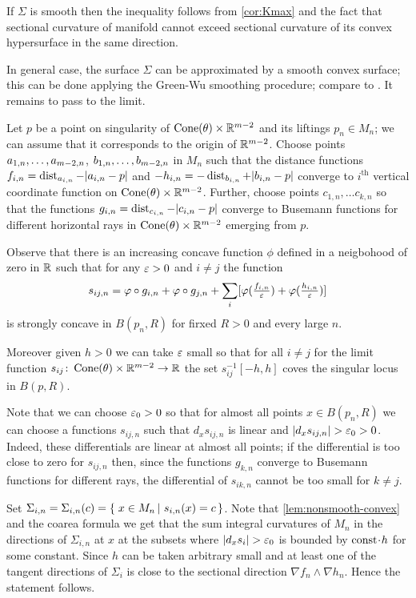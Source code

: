  If $\Sigma$ is smooth then the inequality follows from \ref{cor:Kmax} and the fact that sectional curvature of manifold cannot exceed sectional curvature of its convex hypersurface in the same direction.

In general case, the surface $\Sigma$ can be approximated by a smooth convex surface;
this can be done applying the Green-Wu smoothing procedure; compare to \cite{AKP-buyalo}.
It remains to pass to the limit.
\qeds

Let $p$ be a point on singularity of $\operatorname{Cone}(\theta)\times \mathbb{R}^{m-2}$ and its liftings $p_n\in M_n$;
we can assume that it corresponds to the origin of $\mathbb{R}^{m-2}$.
Choose points $a_{1,n},\zz\dots,a_{m-2,n}$, $b_{1,n},\zz\dots,b_{m-2,n}$ in $M_n$ such that the distance functions $f_{i,n}=\operatorname{\rm dist}_{a_{i,n}}-|a_{i,n}-p|$ and $-h_{i,n}=-\operatorname{\rm dist}_{b_{i,n}}+|b_{i,n}-p|$ converge to $i^{\text{th}}$ vertical coordinate function on $\operatorname{Cone}(\theta)\times \mathbb{R}^{m-2}$.
Further, choose points $c_{1,n},\dots c_{k,n}$ so that the functions $g_{i,n}=\operatorname{\rm dist}_{c_{i,n}}-|c_{i,n}-p|$ converge to Busemann functions for different horizontal rays in $\operatorname{Cone}(\theta)\times \mathbb{R}^{m-2}$ emerging from $p$.

Observe that there is an increasing concave function $\phi$ defined in a neigbohood of zero in $\mathbb{R}$ such that for any $\varepsilon>0$ and $i\ne j$ the function 
\[s_{ij,n}=\varphi\circ g_{i,n} + \varphi\circ g_{j,n}+\sum_i[\varphi(\tfrac{f_{i,n}}{\varepsilon})+\varphi(\tfrac{h_{i,n}}{\varepsilon})]\]
is strongly concave in $B(p_n,R)$ for firxed $R>0$ and every large $n$.

Moreover given $h>0$ we can take $\varepsilon$ small so that for all $i\ne j$ for the limit function $s_{ij}\colon\operatorname{Cone}(\theta)\times \mathbb{R}^{m-2}\to \mathbb{R}$ the set $s_{ij}^{-1}[-h,h]$ coves the singular locus in $B(p,R)$. 

Note that we can choose $\varepsilon_0>0$ so that for almost all points $x\in B(p_n,R)$ 
we can choose a functions $s_{ij,n}$ such that $d_xs_{ij,n}$ is linear and $|d_xs_{ij,n}|>\eps_0>0$.
Indeed, these differentials are linear at almost all points;
if the differential is too close to zero for $s_{ij,n}$ then, since the functions $g_{k,n}$ converge to Busemann functions for different rays, the differential of $s_{ik,n}$ cannot be too small for $k\ne j$.

Set $\Sigma_{i,n}=\Sigma_{i,n}(c)=\set{x\in M_n}{s_{i,n}(x)=c}$.
Note that \ref{lem:nonsmooth-convex} and the coarea formula we get that the sum integral curvatures of $M_n$ in the directions of $\Sigma_{i,n}$ at $x$ at the subsets where $|d_xs_i|>\eps_0$ is bounded by $\const\cdot h$ for some constant.
Since $h$ can be taken arbitrary small and at least one of the tangent directions of $\Sigma_i$ is close to the sectional direction $\nabla f_n\wedge\nabla h_n$.
Hence the statement follows.
\qeds


